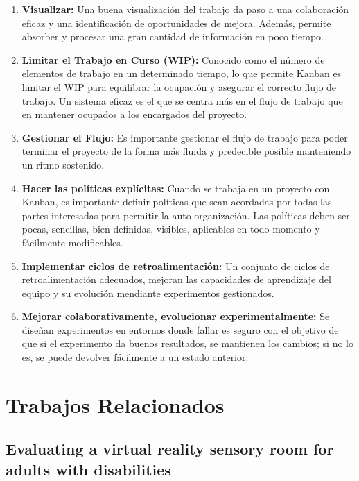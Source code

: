\begin{enumerate}
    \item \textbf{Visualizar:} Una buena visualización del trabajo da paso a una colaboración eficaz y una identificación de oportunidades de mejora. Además, permite absorber y procesar una gran cantidad de información en poco tiempo.
    \item \textbf{Limitar el Trabajo en Curso (WIP):} Conocido como el número de elementos de trabajo en un determinado tiempo, lo que permite Kanban es limitar el WIP para equilibrar la ocupación y asegurar el correcto flujo de trabajo. Un sistema eficaz es el que se centra más en el flujo de trabajo que en mantener ocupados a los encargados del proyecto.
    \item \textbf{Gestionar el Flujo:} Es importante gestionar el flujo de trabajo para poder terminar el proyecto de la forma más fluida y predecible posible manteniendo un ritmo sostenido.
    \item \textbf{Hacer las políticas explícitas:} Cuando se trabaja en un proyecto con Kanban, es importante definir políticas que sean acordadas por todas las partes interesadas para permitir la auto organización. Las políticas deben ser pocas, sencillas, bien definidas, visibles, aplicables en todo momento y fácilmente modificables.
    \item \textbf{Implementar ciclos de retroalimentación:} Un conjunto de ciclos de retroalimentación adecuados, mejoran las capacidades de aprendizaje del equipo y su evolución mendiante experimentos gestionados.
    \item \textbf{Mejorar colaborativamente, evolucionar experimentalmente:} Se diseñan experimentos en entornos donde fallar es seguro con el objetivo de que si el experimento da buenos resultados, se mantienen los cambios; si no lo es, se puede devolver fácilmente a un estado anterior.
\end{enumerate}

\section{Trabajos Relacionados}

\subsection{Evaluating a virtual reality sensory room for adults with disabilities}

